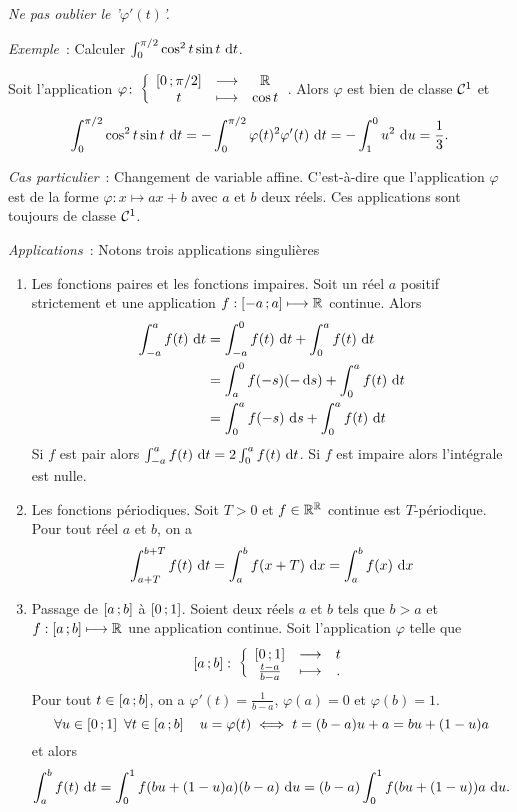 \danger \emph{Ne pas oublier le '\(\varphi'(t)\)'.}

\emph{Exemple}~: Calculer \(\int_0^{\pi/2} \cos^2 t \sin t\,\mathop{}\mathopen{}\mathrm{d} t\). 

Soit l'application \(\varphi\colon \left\{\begin{array}{ccc} \left[ 0 \, ;  \pi/2 \right] & \longrightarrow &\mathbb{R}\\ t & \longmapsto & \cos t \end{array} \right.\). Alors \(\varphi\) est bien de classe \(\mathcal{C}^{1}\) et
\begin{equation}
  \int_0^{\pi/2} \cos^2 t \sin t\,\mathop{}\mathopen{}\mathrm{d} t = -\int_0^{\pi/2} \varphi(t)^2\varphi'(t)\,\mathop{}\mathopen{}\mathrm{d} t = -\int_1^0 u^2\,\mathop{}\mathopen{}\mathrm{d} u =\frac{1}{3}.
\end{equation}


\emph{Cas particulier}~: Changement de variable affine. C'est-à-dire que l'application \(\varphi\) est de la forme \(\varphi : x \longmapsto ax+b\) avec \(a\) et \(b\) deux réels. Ces applications sont toujours de classe \(\mathcal{C}^{1}\).

\emph{Applications}~: Notons trois applications singulières
\begin{enumerate}
\item Les fonctions paires et les fonctions impaires. Soit un réel \(a\) positif strictement et une application \(f : \left[ -a \, ;  a \right] \longmapsto \mathbb{R}\) continue. Alors
  \begin{align}
    \int_{-a}^a f(t)\,\mathop{}\mathopen{}\mathrm{d} t &=\int_{-a}^0 f(t)\,\mathop{}\mathopen{}\mathrm{d} t + \int_{0}^a f(t)\,\mathop{}\mathopen{}\mathrm{d} t \\
    &=\int_a^0 f(-s)(-\mathop{}\mathopen{}\mathrm{d} s) + \int_{0}^a f(t)\,\mathop{}\mathopen{}\mathrm{d} t \\
    &=\int_0^a f(-s)\,\mathop{}\mathopen{}\mathrm{d} s + \int_{0}^a f(t)\,\mathop{}\mathopen{}\mathrm{d} t \\
  \end{align}
  Si \(f\) est pair alors \(\int_{-a}^a f(t)\,\mathop{}\mathopen{}\mathrm{d} t = 2 \int_{0}^a f(t)\,\mathop{}\mathopen{}\mathrm{d} t\). Si \(f\) est impaire alors l'intégrale est nulle.

\item Les fonctions périodiques. Soit \(T >0\) et \(f \in \mathbb{R}^{\mathbb{R}}\) continue est \(T\)-périodique. Pour tout réel \(a\) et \(b\), on a
  \begin{equation}
    \int_{a+T}^{b+T} f(t)\,\mathop{}\mathopen{}\mathrm{d} t = \int_a^bf(x+T)\,\mathop{}\mathopen{}\mathrm{d} x = \int_a^bf(x)\,\mathop{}\mathopen{}\mathrm{d} x
  \end{equation}
\item Passage de \(\left[ a \, ;  b \right]\) à \(\left[ 0 \, ;  1 \right]\). Soient deux réels \(a\) et \(b\) tels que \(b>a\) et \(f:\left[ a \, ;  b \right] \longmapsto \mathbb{R}\) une application continue. Soit l'application \(\varphi\) telle que
  \begin{equation}
    \left[ a \, ;  b \right]\colon \left\{\begin{array}{ccc} \left[ 0 \, ;  1 \right] & \longrightarrow &t\\ \frac{t-a}{b-a} & \longmapsto & . \end{array} \right.
  \end{equation}
  Pour tout \(t \in \left[ a \, ;  b \right]\), on a \(\varphi'(t) = \frac{1}{b-a}\), \(\varphi(a)=0\) et \(\varphi(b)=1\).
  \begin{equation}
    \forall u \in \left[ 0 \, ;  1 \right] \ \forall t \in \left[ a \, ;  b \right] \quad u=\varphi(t) \iff t=(b-a)u +a = bu +(1-u)a
  \end{equation}
  et alors
  \begin{equation}
    \int_a^b f(t)\,\mathop{}\mathopen{}\mathrm{d} t = \int_0^1 f(bu+(1-u)a)(b-a)\,\mathop{}\mathopen{}\mathrm{d} u = (b-a) \int_0^1 f(bu+(1-u))a\,\mathop{}\mathopen{}\mathrm{d} u.
  \end{equation}
\end{enumerate}

